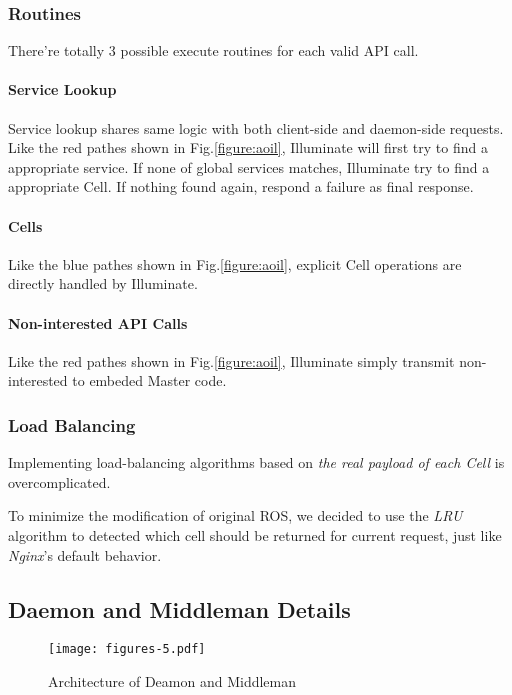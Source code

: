 \subsubsection{Routines}
There're totally 3 possible execute routines for each valid API call.

\paragraph{Service Lookup}
Service lookup shares same logic with both client-side and daemon-side requests.
Like the red pathes shown in Fig.\ref{figure:aoil}, Illuminate will first try 
to find a appropriate service. If none of global services matches, 
Illuminate try to find a appropriate Cell.
If nothing found again, respond a failure as final response.
 
\paragraph{Cells}
Like the blue pathes shown in Fig.\ref{figure:aoil}, explicit Cell operations
are directly handled by Illuminate.

\paragraph{Non-interested API Calls}
Like the red pathes shown in Fig.\ref{figure:aoil},
Illuminate simply transmit non-interested to embeded Master code.

\subsubsection{Load Balancing}
Implementing load-balancing algorithms based on \emph{the real payload of each Cell} is overcomplicated.

To minimize the modification of original ROS, we decided to use the \emph{LRU} algorithm to detected which cell should be returned for current request, just like \emph{Nginx}'s default behavior.


\subsection{Daemon and Middleman Details}

\begin{figure}[!t]
\centering
\texttt{[image: figures-5.pdf]}
\caption{Architecture of Deamon and Middleman}
\label{figure:aodm}
\end{figure}

